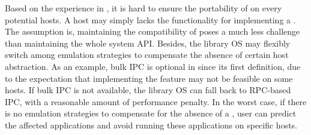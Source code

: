Based on the experience in \graphene{},
it is hard to ensure the portability of \thehostabi{} on every potential hosts.
A host may simply lacks the functionality
for implementing a \hostapi{}.
The assumption is, maintaining the compatibility of \thehostabi{} poses a much less challenge than maintaining the whole system API.
Besides, the library OS may flexibly switch among emulation strategies
to compensate the absence of certain host abstraction.
As an example,
bulk IPC is optional in \thehostabi{} since its first definition,
due to the expectation
that implementing the feature may not be feasible on some hosts.
If bulk IPC is not available,
the library OS can fall back to RPC-based IPC, with a reasonable amount of performance penalty.
In the worst case, if there is no emulation strategies
to compensate for the absence of a \hostapi{},
user can predict the affected applications and avoid running these applications
on specific hosts. 











